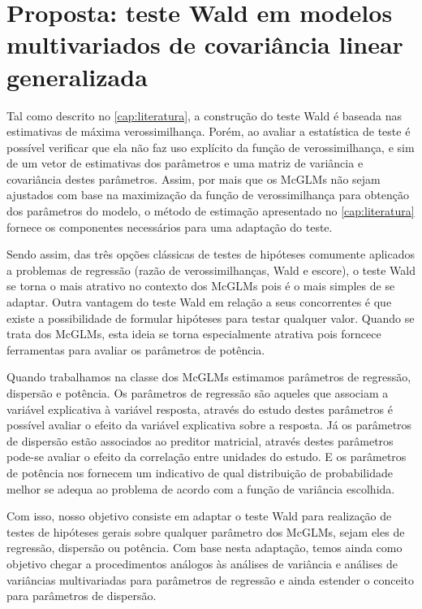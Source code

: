 
\chapter{Proposta: teste Wald em modelos multivariados de covariância linear generalizada}

\label{cap:proposta}

Tal como descrito no \autoref{cap:literatura}, a construção do teste Wald é baseada nas estimativas de máxima verossimilhança. Porém, ao avaliar a estatística de teste é possível verificar que ela não faz uso explícito da função de verossimilhança, e sim de um vetor de estimativas dos parâmetros e uma matriz de variância e covariância destes parâmetros. Assim, por mais que os McGLMs não sejam ajustados com base na maximização da função de verossimilhança para obtenção dos parâmetros do modelo, o método de estimação apresentado no \autoref{cap:literatura} fornece os componentes necessários para uma adaptação do teste. 

Sendo assim, das três opções clássicas de testes de hipóteses comumente aplicados a problemas de regressão (razão de verossimilhanças, Wald e escore), o teste Wald se torna o mais atrativo no contexto dos McGLMs pois é o mais simples de se adaptar. Outra vantagem do teste Wald em relação a seus concorrentes é que existe a possibilidade de formular hipóteses para testar qualquer valor. Quando se trata dos McGLMs, esta ideia se torna especialmente atrativa pois forncece ferramentas para avaliar os parâmetros de potência.

Quando trabalhamos na classe dos McGLMs estimamos parâmetros de regressão, dispersão e potência. Os parâmetros de regressão são aqueles que associam a variável explicativa à variável resposta, através do estudo destes parâmetros é possível avaliar o efeito da variável explicativa sobre a resposta. Já os parâmetros de dispersão estão associados ao preditor matricial, através destes parâmetros pode-se avaliar o efeito da correlação entre unidades do estudo. E os parâmetros de potência nos fornecem um indicativo de qual distribuição de probabilidade melhor se adequa ao problema de acordo com a função de variância escolhida. 

Com isso, nosso objetivo consiste em adaptar o teste Wald para realização de testes de hipóteses gerais sobre qualquer parâmetro dos McGLMs, sejam eles de regressão, dispersão ou potência. Com base nesta adaptação, temos ainda como objetivo chegar a procedimentos análogos às análises de variância e análises de variâncias multivariadas para parâmetros de regressão e ainda estender o conceito para parâmetros de dispersão. 

